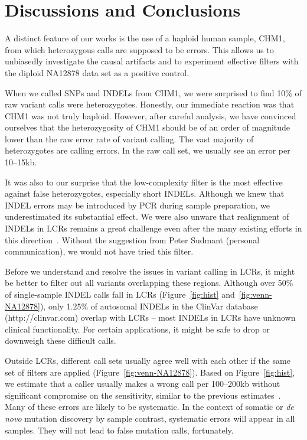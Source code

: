 \documentclass{bioinfo-ori}
\begin{document}
\section{Discussions and Conclusions}
A distinct feature of our works is the use of a haploid human sample, CHM1,
from which heterozygous calls are supposed to be errors. This allows us to unbiasedly
investigate the causal artifacts and to experiment effective filters with the
diploid NA12878 data set as a positive control.

When we called SNPs and INDELs from CHM1, we were surprised to find 10\% of raw
variant calls were heterozygotes. Honestly, our immediate reaction was that
CHM1 was not truly haploid. However, after careful analysis, we have convinced
ourselves that the heterozygosity of CHM1 should be of an order of magnitude
lower than the raw error rate of variant calling. The vast majority of
heterozygotes are calling errors. In the raw call set, we usually see an error
per 10--15kb.

It was also to our surprise that the low-complexity filter is the most
effective against false heterozygotes, especially short INDELs. Although we
knew that INDEL errors may be introduced by PCR during sample preparation, we
underestimated its substantial effect. We were also unware that realignment of
INDELs in LCRs remains a great challenge even after the many existing
efforts in this
direction~\citep{Homer:2010aa,Li:2011kx,Albers:2011aa,Narzisi:2014aa}. Without
the suggestion from Peter Sudmant (personal communication), we would not have
tried this
filter.

Before we understand and resolve the issues in variant calling in LCRs,
it might be better to filter out all variants overlapping these regions.
Although over 50\% of single-sample INDEL calls fall in LCRs
(Figure~\ref{fig:hist} and~\ref{fig:venn-NA12878}), only 1.25\% of autosomal
INDELs in the ClinVar database (http://clinvar.com) overlap with LCRs -- most
INDELs in LCRs have unknown clinical functionality. For certain applications, it might be safe to drop or downweigh
these difficult calls.

Outside LCRs, different call sets usually agree well with each other
if the same set of filters are applied (Figure~\ref{fig:venn-NA12878}). Based
on Figure~\ref{fig:hist}, we estimate that a caller usually makes a wrong call
per 100--200kb without significant compromise on the sensitivity, similar to
the previous estimates~\citep{Bentley:2008cr,Nickles:2012aa}. Many of these
errors are likely to be systematic. In the context of somatic or \emph{de novo}
mutation discovery by sample contrast, systematic errors will appear in all
samples.  They will not lead to false mutation calls, fortunately.
\end{document}
